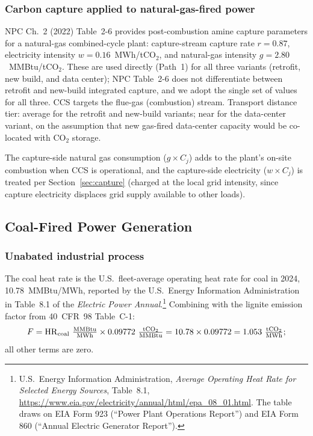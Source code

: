 \documentclass[11pt]{article}
\newcommand{\cotwo}{\ensuremath{\mathrm{CO_2}}}
\begin{document}
\subsubsection{Carbon capture applied to natural-gas-fired power}

NPC Ch.~2 (2022) Table~2-6 provides post-combustion amine capture parameters for a natural-gas combined-cycle plant: capture-stream capture rate $r = 0.87$, electricity intensity $w = 0.16$~MWh/t\cotwo{}, and natural-gas intensity $g = 2.80$~MMBtu/t\cotwo{}. These are used directly (Path~1) for all three variants (retrofit, new build, and data center); NPC Table~2-6 does not differentiate between retrofit and new-build integrated capture, and we adopt the single set of values for all three. CCS targets the flue-gas (combustion) stream. Transport distance tier: average for the retrofit and new-build variants; near for the data-center variant, on the assumption that new gas-fired data-center capacity would be co-located with \cotwo{} storage.

The capture-side natural gas consumption ($g \times C_j$) adds to the plant's on-site combustion when CCS is operational, and the capture-side electricity ($w \times C_j$) is treated per Section~\ref{sec:capture} (charged at the local grid intensity, since capture electricity displaces grid supply available to other loads).

\subsection{Coal-Fired Power Generation}
\label{sec:const_coal}

\subsubsection{Unabated industrial process}

The coal heat rate is the U.S.\ fleet-average operating heat rate for coal in 2024, 10.78~MMBtu/MWh, reported by the U.S.\ Energy Information Administration in Table~8.1 of the \emph{Electric Power Annual}.\footnote{U.S.\ Energy Information Administration, \emph{Average Operating Heat Rate for Selected Energy Sources}, Table~8.1, \url{https://www.eia.gov/electricity/annual/html/epa_08_01.html}. The table draws on EIA Form 923 (``Power Plant Operations Report'') and EIA Form 860 (``Annual Electric Generator Report'').} Combining with the lignite emission factor from 40~CFR~98 Table~C-1:
%
\[
  F = \mathrm{HR}_{\text{coal}}~\tfrac{\text{MMBtu}}{\text{MWh}} \times 0.09772~\tfrac{\text{t\cotwo{}}}{\text{MMBtu}} = 10.78 \times 0.09772 = 1.053~\tfrac{\text{t\cotwo{}}}{\text{MWh}};
\]
%
all other terms are zero.
\end{document}
